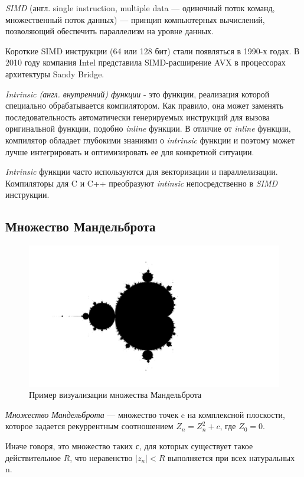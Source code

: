 \documentclass[a4paper, 12pt]{article}
\begin{document}
\textit{SIMD} (англ. single instruction, multiple data — одиночный поток команд, множественный поток данных) — принцип компьютерных вычислений, позволяющий обеспечить параллелизм на уровне данных.

Короткие SIMD инструкции (64 или 128 бит) стали появляться в 1990-х годах.
В 2010 году компания Intel представила SIMD-расширение AVX в процессорах архитектуры Sandy Bridge.

\textit{Intrinsic (англ. внутренний) функции} -  это функции, реализация которой специально обрабатывается компилятором. Как правило, она может заменять последовательность автоматически генерируемых инструкций для вызова оригинальной функции, подобно \textit{inline} функции. В отличие от \textit{inline} функции, компилятор обладает глубокими знаниями о \textit{intrinsic} функции и поэтому может лучше интегрировать и оптимизировать ее для конкретной ситуации.

\textit{Intrinsic} функции часто используются для векторизации и параллелизации. Компиляторы для C и C++ преобразуют \textit{intinsic} непосредственно в \textit{SIMD} инструкции.

\subsection*{Множество Мандельброта}
\begin{figure}[h]
    \centering
    \includegraphics[width=1\linewidth]{mandelbrot_example.png}
    \caption{Пример визуализации множества Мандельброта}
\end{figure}
\textit{Множество Мандельброта} — множество точек c на комплексной плоскости, которое задается рекуррентным соотношением $Z_n = Z_n^2 + c$, где $Z_0 = 0$.

Иначе говоря, это множество таких $с$, для которых существует такое действительное $R$, что неравенство $|z_n| < R$ выполняется при всех натуральных n.\\
\end{document}
